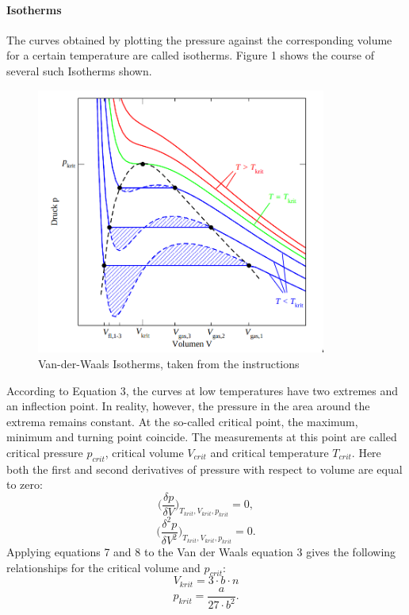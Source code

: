 \documentclass[10pt,a4paper]{article}
\begin{document}
\paragraph{Isotherms}
The curves obtained by plotting the pressure against the corresponding volume for a certain temperature are called isotherms. Figure 1 shows the course of several such
Isotherms shown.\begin{figure}[hbt!]
\includegraphics[width=270pt, center]{vaniso.png}
\caption{Van-der-Waals Isotherms, taken from the instructions \cite{instructions}}
\label{fig:length_eight_mouse}
\end{figure} According to Equation 3, the curves at low temperatures have two extremes and an inflection point.
In reality, however, the pressure in the area around the extrema remains constant. At the so-called critical point, the maximum, minimum and turning point coincide. The measurements at this point are called critical pressure $p_{crit}$, critical volume $V_{crit}$ and critical temperature $T_{crit}$. Here both the first and second derivatives of pressure with respect to volume are equal to zero:
\begin{equation}
    \bigg(\frac{\delta p}{\delta V}\bigg)_{T_{krit},V_{krit},p_{krit}} = 0,
\end{equation}
\begin{equation}
    \bigg(\frac{\delta^2 p}{\delta V^2}\bigg)_{T_{krit},V_{krit},p_{krit}} = 0.
\end{equation}
Applying equations 7 and 8 to the Van der Waals equation 3 gives the following relationships for the critical volume and $p_{crit}$:
\begin{equation}
    V_{krit} = 3 \cdot b \cdot n
\end{equation}
\begin{equation}
    p_{krit} = \frac{a}{27 \cdot b^2}.
\end{equation}
\end{document}

